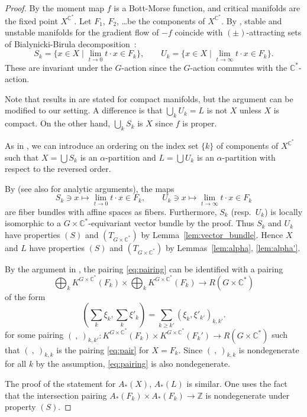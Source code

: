 \documentclass[12pt]{amsart}
\def\Bbb{\mathbb}
\theoremstyle{definition}
\theoremstyle{remark}
\numberwithin{equation}{subsection}
\newcommand{\lemref}[1]{Lemma~\ref{#1}}
\newcommand{\C}{{\Bbb C}}
\newcommand{\Z}{{\Bbb Z}}
\begin{document}
\begin{proof}
By \cite[2.2]{Atiyah} the moment map $f$ is a Bott-Morse function, and
critical manifolds are the fixed point $X^{\C^*}$.
%
Let $F_1$, $F_2$, \dots be the components of $X^{\C^*}$.
By \cite[\S3]{Atiyah}, stable and unstable manifolds for the gradient
flow of $-f$ coincide with $(\pm)$-attracting sets of
Bialynicki-Birula decomposition~\cite{BiaB}:
\begin{equation*}
   S_k = \{ x\in X\mid \lim_{t\to 0} t\cdot x\in F_k \},\qquad
   U_k = \{ x\in X\mid \lim_{t\to \infty} t\cdot x \in F_k \}.
\end{equation*}
These are invariant under the $G$-action since the $G$-action commutes 
with the $\C^*$-action.

Note that results in \cite{Atiyah} are stated for compact manifolds,
but the argument can be modified to our setting. A difference is that
$\bigcup_k U_k = L$ is not $X$ unless $X$ is compact.
%
On the other hand,  $\bigcup_k S_k$ is $X$ since $f$ is proper.

As in \cite{Atiyah2}, we can introduce an ordering on the index set
$\{ k\}$ of components of $X^{\C^*}$ such that
$X = \bigcup S_k$ is an $\alpha$-partition and $L = \bigcup U_k$ is
an $\alpha$-partition with respect to the reversed order.

By \cite{BiaB} (see also \cite{CS} for analytic arguments), the maps
\begin{equation*}
   S_k \ni x \mapsto \lim_{t\to 0} t\cdot x\in F_k, \qquad
   U_k \ni x \mapsto \lim_{t\to \infty} t\cdot x\in F_k
\end{equation*}
are fiber bundles with affine spaces as fibers.
%
Furthermore, $S_k$ (resp.\ $U_k$) is locally isomorphic to a
$G\times\C^*$-equivariant vector bundle by the proof.
%
Thus $S_k$ and $U_k$ have properties $(S)$ and $(T_{G\times\C^*})$ by
\lemref{lem:vector_bundle}.
%
Hence $X$ and $L$ have properties $(S)$ and $(T_{G\times\C^*})$ by
Lemmas~\ref{lem:alpha}, \ref{lem:alpha'}.

By the argument in \cite[1.7, 2.5]{Lu-Base2}, the pairing
\eqref{eq:pairing} can be identified with a pairing
\[
   \bigoplus_k K^{G\times\C^*} (F_k) \times
     \bigoplus_k K^{G\times\C^*} (F_k) \to R(G\times\C^*)
\]
of the form
\[
   \left( \sum_k \xi_k, \sum_k \xi'_k \right)
   = \sum_{k\ge k'} (\xi_k, \xi'_{k'})_{k,k'}.
\]
for some pairing $(\ ,\ )_{k,k'}\colon
K^{G\times\C^*}(F_k)\times K^{G\times\C^*}(F_k')\to R(G\times\C^*)$
such that $(\ ,\ )_{k,k}$ is the pairing \eqref{eq:pair} for $X =
F_k$. Since $(\ ,\ )_{k,k}$ is nondegenerate for all $k$ by the assumption,
\eqref{eq:pairing} is also nondegenerate.

The proof of the statement for $A_*(X)$, $A_*(L)$ is similar. One uses 
the fact that the intersection pairing $A_*(F_k)\times A_*(F_k)\to \Z$ 
is nondegenerate under property $(S)$.
\end{proof}
\end{document}
